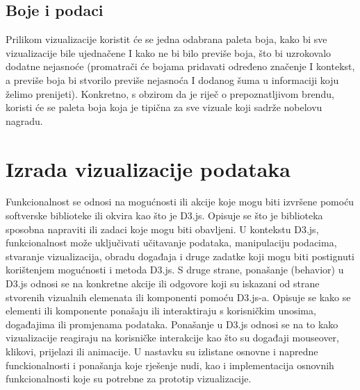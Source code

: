 \documentclass[12pt]{article}
\numberwithin{equation}{section}
\begin{document}
\subsection{Boje i podaci}
Prilikom vizualizacije koristit će se jedna odabrana paleta boja, kako bi sve vizualizacije bile ujednačene I kako ne bi bilo previše boja, što bi uzrokovalo dodatne nejasnoće (promatrači će bojama pridavati određeno značenje I kontekst, a previše boja bi stvorilo previše nejasnoća I dodanog šuma u informaciji koju želimo prenijeti). Konkretno, s obzirom da je riječ o prepoznatljivom brendu, koristi će se paleta boja koja je tipična za sve vizuale koji sadrže nobelovu nagradu.
\newpage
\section{Izrada vizualizacije podataka}
Funkcionalnost se odnosi na mogućnosti ili akcije koje mogu biti izvršene pomoću softverske biblioteke ili okvira kao što je D3.js. Opisuje se što je biblioteka sposobna napraviti ili zadaci koje mogu biti obavljeni. U kontekstu D3.js, funkcionalnost može uključivati učitavanje podataka, manipulaciju podacima, stvaranje vizualizacija, obradu događaja i druge zadatke koji mogu biti postignuti korištenjem mogućnosti i metoda D3.js. S druge strane, ponašanje (behavior) u D3.js odnosi se na konkretne akcije ili odgovore koji su iskazani od strane stvorenih vizualnih elemenata ili komponenti pomoću D3.js-a. Opisuje se kako se elementi ili komponente ponašaju ili interaktiraju s korisničkim unosima, događajima ili promjenama podataka. Ponašanje u D3.js odnosi se na to kako vizualizacije reagiraju na korisničke interakcije kao što su događaji mouseover, klikovi, prijelazi ili animacije. U nastavku su izlistane osnovne i napredne funckionalnosti i ponašanja koje rješenje nudi, kao i implementacija osnovnih funkcionalnosti koje su potrebne za prototip vizualizacije.
\end{document}
